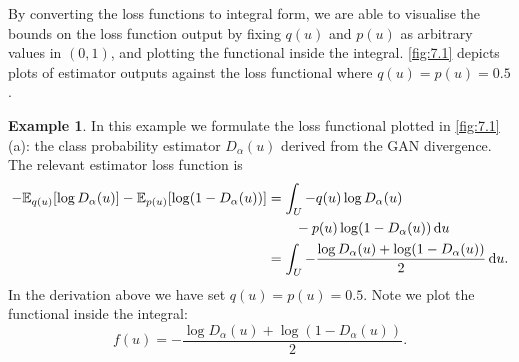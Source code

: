 \documentclass[honours,12pt, twoside]{unswthesis}
\newcommand{\E}{\mathbb{E}}
\numberwithin{equation}{section}
\theoremstyle{definition}
\newtheorem{example}[theorem]{Example}
\begin{document}
By converting the loss functions to integral form, we are able to visualise the bounds on the loss function output by fixing $q(u)$ and $p(u)$ as arbitrary values in $(0,1)$, and plotting the functional inside the integral. \autoref{fig:7.1} depicts plots of estimator outputs against the loss functional where $q(u)=p(u)=0.5$.
\begin{example}
In this example we formulate the loss functional plotted in \autoref{fig:7.1} (a): the class probability estimator $D_\alpha(u)$ derived from the GAN divergence. The relevant estimator loss function is
\begin{align*}
-\E_{q(u)}[\log D_\alpha(u)]-\E_{p(u)}[\log (1-D_\alpha(u))]&=\int_U -q(u)\log D_\alpha(u)\\
&\quad \quad -p(u)\log(1-D_\alpha(u)) \,{\rm d}u\\
&=\int_U -\frac{\log D_\alpha(u)+\log(1-D_\alpha(u))}{2}\,{\rm d}u.
\end{align*}
In the derivation above we have set $q(u)=p(u)=0.5$. Note we plot the functional inside the integral:
\[f(u)=-\frac{\log D_\alpha(u)+\log(1-D_\alpha(u))}{2}.\]
\end{example}
\end{document}
